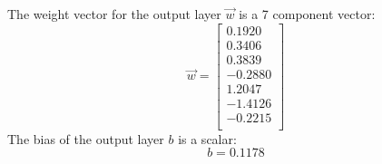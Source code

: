 \documentclass[twoside,english,1p,final,sort&compress]{elsarticle}
\theoremstyle{plain}
\begin{document}
The weight vector for the output layer $\overrightarrow{w}$ is a 7 component vector:
\begin{equation*}
\overrightarrow{w} = \left[
\begin{array}{r}
0.1920\\
0.3406\\
0.3839\\
-0.2880\\
1.2047\\
-1.4126\\
-0.2215\\
\end{array}\right]
\end{equation*}
The bias of the output layer $b$ is a scalar:
\begin{equation*}
b = 0.1178
\end{equation*}
\end{document}
